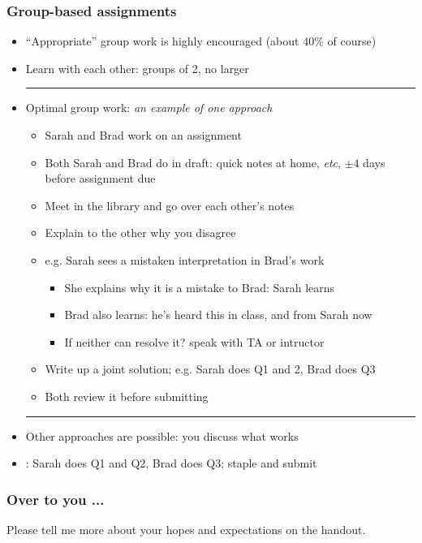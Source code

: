 \begin{frame}\frametitle{Group-based assignments}
	\begin{itemize}
		\item	``Appropriate'' group work is highly encouraged (about 40\% of course)
		\item	Learn with each other: groups of 2, no larger
		\hrule
		\item	Optimal group work: \emph{an example of one approach}
			\begin{itemize}
				\item	Sarah and Brad work on an assignment
				\item	Both Sarah and Brad do {} in draft: quick notes at home, \emph{etc}, $\pm 4$ days before assignment due
				\item	Meet in the library and go over each other's notes
				\item	Explain to the other why you disagree
				\item	e.g. Sarah sees a mistaken interpretation in Brad's work
				\begin{itemize}
					\item	She explains why it is a mistake to Brad: Sarah learns
					\item	Brad also learns: he's heard this in class, and from Sarah now
					\item	If neither can resolve it? speak with TA or intructor					
				\end{itemize}
				\item	Write up a joint solution; e.g. Sarah does Q1 and 2, Brad does Q3
				\item	Both review it before submitting
			\end{itemize}
		\hrule
		\item	Other approaches are possible: you discuss what works
		\item	\color{myOrange}{What doesn't work}: Sarah does Q1 and Q2, Brad does Q3; staple and submit
	\end{itemize}
\end{frame}

\begin{frame}\frametitle{Over to you ...}
	Please tell me more about your hopes and expectations on the handout.
\end{frame}